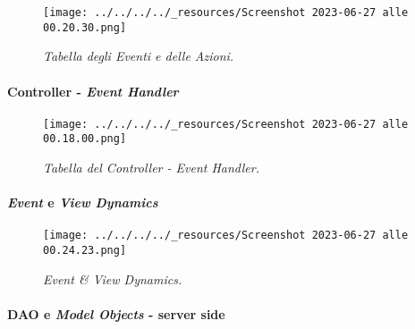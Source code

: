 \begin{figure}
\centering
\texttt{[image: ../../../../\_resources/Screenshot 2023-06-27 alle 00.20.30.png]}
\caption{\emph{Tabella degli Eventi e delle Azioni.}}
\end{figure}

\hypertarget{controller---event-handler}{%
\paragraph{\texorpdfstring{Controller - \emph{Event
Handler}}{Controller - Event Handler}}\label{controller---event-handler}}

\begin{figure}
\centering
\texttt{[image: ../../../../\_resources/Screenshot 2023-06-27 alle 00.18.00.png]}
\caption{\emph{Tabella del Controller - Event Handler.}}
\end{figure}

\hypertarget{event-e-view-dynamics}{%
\paragraph{\texorpdfstring{\emph{Event} e \emph{View
Dynamics}}{Event e View Dynamics}}\label{event-e-view-dynamics}}

\begin{figure}
\centering
\texttt{[image: ../../../../\_resources/Screenshot 2023-06-27 alle 00.24.23.png]}
\caption{\emph{Event \& View Dynamics.}}
\end{figure}

\hypertarget{dao-e-model-objects---server-side}{%
\paragraph{\texorpdfstring{DAO e \emph{Model Objects} - server
side}{DAO e Model Objects - server side}}\label{dao-e-model-objects---server-side}}


